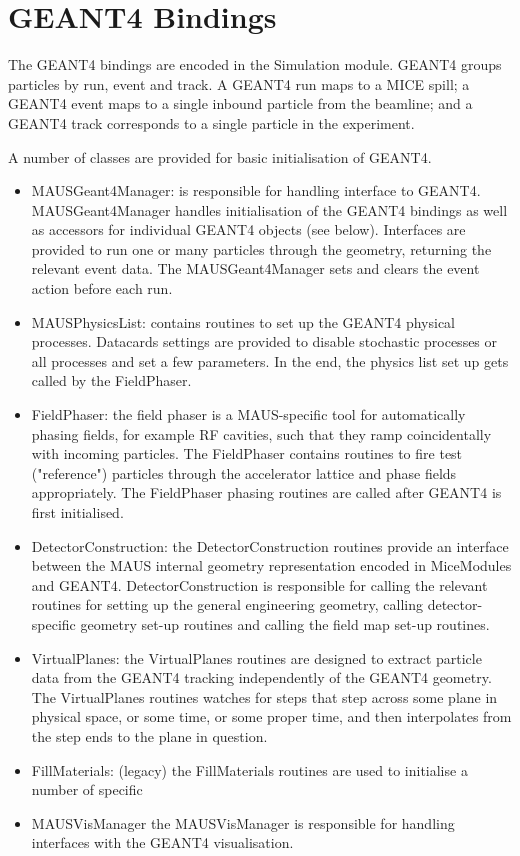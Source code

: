 \section{GEANT4 Bindings}
The GEANT4 bindings are encoded in the Simulation module. GEANT4 groups particles by run, event and track. A GEANT4 run maps to a MICE spill; a GEANT4 event maps to a single inbound particle from the beamline; and a GEANT4 track corresponds to a single particle in the experiment.

A number of classes are provided for basic initialisation of GEANT4.

\begin{itemize}
\item MAUSGeant4Manager: is responsible for handling interface to GEANT4. MAUSGeant4Manager handles initialisation of the GEANT4 bindings as well as accessors for individual GEANT4 objects (see below). Interfaces are provided to run one or many particles through the geometry, returning the relevant event data. The MAUSGeant4Manager sets and clears the event action before each run.
\item MAUSPhysicsList: contains routines to set up the GEANT4 physical processes. Datacards settings are provided to disable stochastic processes or all processes and set a few parameters. In the end, the physics list set up gets called by the FieldPhaser.
\item FieldPhaser: the field phaser is a MAUS-specific tool for automatically phasing fields, for example RF cavities, such that they ramp coincidentally with incoming particles. The FieldPhaser contains routines to fire test ("reference") particles through the accelerator lattice and phase fields appropriately. The FieldPhaser phasing routines are called after GEANT4 is first initialised.
\item DetectorConstruction: the DetectorConstruction routines provide an interface between the MAUS internal geometry representation encoded in MiceModules and GEANT4. DetectorConstruction is responsible for calling the relevant routines for setting up the general engineering geometry, calling detector-specific geometry set-up routines and calling the field map set-up routines.
\item VirtualPlanes: the VirtualPlanes routines are designed to extract particle data from the GEANT4 tracking independently of the GEANT4 geometry. The VirtualPlanes routines watches for steps that step across some plane in physical space, or some time, or some proper time, and then interpolates from the step ends to the plane in question.
\item FillMaterials: (legacy) the FillMaterials routines are used to initialise a number of specific 
\item MAUSVisManager the MAUSVisManager is responsible for handling interfaces with the GEANT4 visualisation.
\end{itemize}

